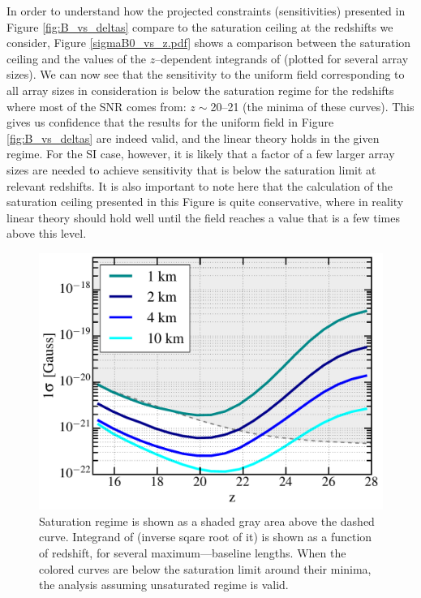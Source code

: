 In order to understand how the projected constraints (sensitivities) presented in Figure \ref{fig:B_vs_deltas} compare to the saturation ceiling at the redshifts we consider, Figure \ref{sigmaB0_vs_z.pdf} shows a comparison between the saturation ceiling and the values of the $z$--dependent integrands of \eq{\ref{eq:fisher_patch}} (plotted for several array sizes). We can now see that the sensitivity to the uniform field corresponding to all array sizes in consideration is below the saturation regime for the redshifts where most of the SNR comes from: $z\sim$20--21 (the minima of these curves). This gives us confidence that the results for the uniform field in Figure \ref{fig:B_vs_deltas} are indeed valid, and the linear theory holds in the given regime. For the SI case, however, it is likely that a factor of a few larger array sizes are needed to achieve sensitivity that is below the saturation limit at relevant redshifts. It is also important to note here that the calculation of the saturation ceiling presented in this Figure is quite conservative, where in reality  linear theory should hold well until the field reaches a value that is a few times above this level.
\begin{figure}
\centering
\includegraphics[width=.35\textwidth,keepaspectratio=true]{sigmaB0_vs_z.pdf}
\caption{Saturation regime is shown as a shaded gray area above the dashed curve. Integrand of \eq{\ref{eq:fisher_patch}} (inverse sqare root of it) is shown as a function of redshift, for several maximum---baseline lengths.  When the colored curves are below the saturation limit around their minima, the analysis assuming unsaturated regime is valid.\label{fig:Bsat}}
\end{figure}
